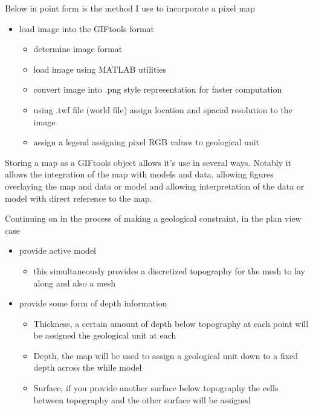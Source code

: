 Below in point form is the method I use to incorporate a pixel map

\begin{itemize}
\item load image into the GIFtools format
\begin{itemize}
	\item determine image format
	\item load image using MATLAB utilities
	\item convert image into .png style representation for faster computation
	\item using .twf file (world file) assign location and spacial resolution to the image
	\item assign a legend assigning pixel RGB values to geological unit
\end{itemize}
\end{itemize}

Storing a map as a GIFtools object allows it's use in several ways. Notably it allows the integration of the map with models and data, allowing figures overlaying the map and data or model and allowing interpretation of the data or model with direct reference to the map.

Continuing on in the process of making a geological constraint, in the plan view case

\begin{itemize}
\item provide active model	
\begin{itemize}
	\item this simultaneously provides a discretized topography for the mesh to lay along and also a mesh
\end{itemize}
\item provide some form of depth information
\begin{itemize}
	\item Thickness, a certain amount of depth below topography at each point will be assigned the geological unit at each 
	\item Depth, the map will be used to assign a geological unit down to a fixed depth across the while model
	\item Surface, if you provide another surface below topography the cells between topography and the other surface will be assigned
\end{itemize}
\end{itemize}


%

\endinput

 Interestingly, the assumption that all magnetizations are in the same direction also assumes that all Koenigsberger ratios are equal.

Any text after an \endinput is ignored.
You could put scraps here or things in progress.

